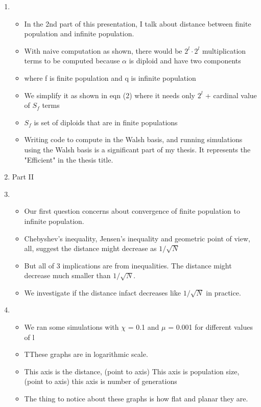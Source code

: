 \documentclass{article}
\begin{document}
\begin{enumerate}
\item
  \begin{itemize}
  \item In the 2nd part of this presentation, I talk about distance between finite population and infinite population.
  \item With naive computation as shown, there would
    be $2^l \cdot 2^l$ multiplication terms to be computed because $\alpha$ is diploid and have two components
  \item where f is finite population and q is infinite population
  \item We simplify it as shown in eqn (2) where it needs only $2^l$ +
    cardinal value of $S_f$ terms
  \item $S_f$ is set of diploids that are in finite populations
  
  \item Writing code to compute in the Walsh basis, and running simulations using the Walsh basis 
  is a significant part of my thesis. It represents the "Efficient" in the thesis title.
  \end{itemize}
  
\item {Part II}
  
\item
  \begin{itemize}
  \item Our first question concerns about convergence of finite population to infinite population.
  \item Chebyshev's inequality, Jensen's inequality and geometric point of view, all, suggest the distance might decrease
    as $1/\sqrt{ N}$
  \item But all of 3 implications are from inequalities. The distance
    might decrease much smaller than $1/\sqrt{ N}$.
  \item We investigate if the distance infact decreases like $1/\sqrt{N}$ in practice. 
  \end{itemize}
  
\item
  \begin{itemize}
  \item We ran some simulations with $\chi$ = 0.1 and $\mu$ = 0.001 for
    different values of l
  \item TThese graphs are in logarithmic scale.
  \item  This axis is the distance, (point to axis) This axis is population size, (point to axis) this axis is number of generations
  \item The thing to notice about these graphs is how flat and planar they are. 
  \end{itemize}
    

\end{enumerate}
\end{document}
